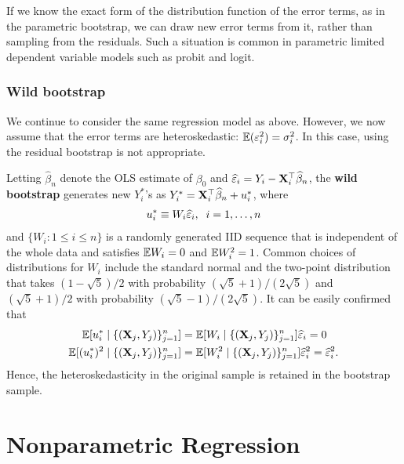 \documentclass[11pt, A4paper, openany, uplatex]{book}
\begin{document}
If we know the exact form of the distribution function of the error terms, as in the parametric bootstrap, we can draw new error terms from it, rather than sampling from the residuals.
Such a situation is common in parametric limited dependent variable models such as probit and logit.

\subsection{Wild bootstrap}

We continue to consider the same regression model as above.
However, we now assume that the error terms are heteroskedastic: $\mathbb{E}(\varepsilon_i^2) = \sigma_i^2$.
In this case, using the residual bootstrap is not appropriate.

Letting $\hat \beta_n$ denote the OLS estimate of $\beta_0$ and $\widehat {\varepsilon}_i = Y_i - \mathbf{X}_i^\top \widehat \beta_n$, the \textbf{wild bootstrap} generates new $Y_i^*$'s as $Y_i^* = \mathbf{X}_i^\top \widehat \beta_n + u_i^*$, where
\begin{align*}
	u_i^* \equiv W_i \widehat {\varepsilon}_i, \;\; i = 1, \ldots, n
\end{align*}
and $\{W_i: 1 \le i \le n\}$ is a randomly generated IID sequence that is independent of the whole data and satisfies $\mathbb{E} W_i = 0$ and $\mathbb{E} W_i^2 = 1$.
Common choices of distributions for $W_i$ include the standard normal and the two-point distribution that takes $(1 - \sqrt{5})/2$ with probability $(\sqrt{5} + 1)/(2 \sqrt{5})$ and $(\sqrt{5} + 1)/2$ with probability $(\sqrt{5} - 1)/(2 \sqrt{5})$.
It can be easily confirmed that
\begin{align*}
	\mathbb{E} [u_i^* \mid \{(\mathbf{X}_j, Y_j)\}_{j=1}^n] 
	& = \mathbb{E} [W_i \mid \{(\mathbf{X}_j, Y_j)\}_{j=1}^n]  \widehat {\varepsilon}_i = 0 \\
	\mathbb{E} [(u_i^*)^2 \mid \{(\mathbf{X}_j, Y_j)\}_{j=1}^n] 
	& = \mathbb{E} [W_i^2  \mid \{(\mathbf{X}_j, Y_j)\}_{j=1}^n]  \widehat {\varepsilon}_i^2 =  \widehat {\varepsilon}_i^2.
\end{align*}
Hence, the heteroskedasticity in the original sample is retained in the bootstrap sample.


\chapter{Nonparametric Regression}\label{chap:nonpara}
\end{document}
